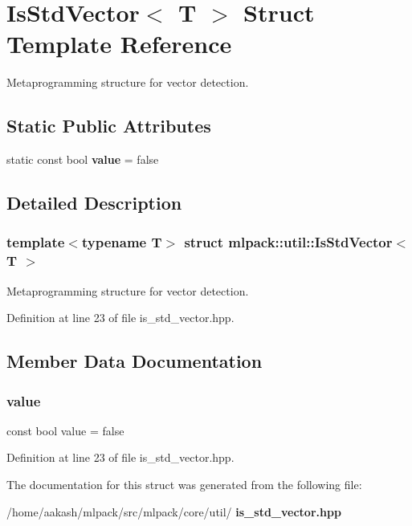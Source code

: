 \section{Is\+Std\+Vector$<$ T $>$ Struct Template Reference}
\label{structmlpack_1_1util_1_1IsStdVector}


Metaprogramming structure for vector detection.  


\subsection*{Static Public Attributes}
\begin{DoxyCompactItemize}
\item 
static const bool \textbf{ value} = false
\end{DoxyCompactItemize}


\subsection{Detailed Description}
\subsubsection*{template$<$typename T$>$\newline
struct mlpack\+::util\+::\+Is\+Std\+Vector$<$ T $>$}

Metaprogramming structure for vector detection. 

Definition at line 23 of file is\+\_\+std\+\_\+vector.\+hpp.



\subsection{Member Data Documentation}
\mbox{\label{structmlpack_1_1util_1_1IsStdVector_a11ddd051208250c32dc4985abcafa86d}} 
\subsubsection{value}
{\footnotesize\ttfamily const bool value = false\hspace{0.3cm}{\ttfamily [static]}}



Definition at line 23 of file is\+\_\+std\+\_\+vector.\+hpp.



The documentation for this struct was generated from the following file\+:\begin{DoxyCompactItemize}
\item 
/home/aakash/mlpack/src/mlpack/core/util/\textbf{ is\+\_\+std\+\_\+vector.\+hpp}\end{DoxyCompactItemize}
